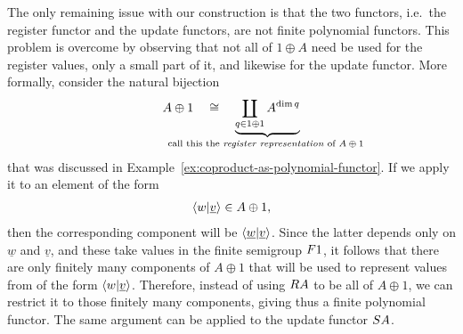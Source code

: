 The only remaining issue with our construction is that the two functors, i.e.~the register functor and the update functors, are not finite polynomial functors. This problem is overcome by observing that not all of $1 \oplus A$ need be used for the register values, only a small part of it, and likewise for the update functor. More formally, 
consider the natural bijection
\begin{align*}
A \oplus 1  \quad \cong \quad 
\myunderbrace{\coprod_{q \in 1 \oplus 1}  A^{\dim q}}{call this the \emph{register representation} of $A \oplus 1$}
\end{align*}
that was discussed in Example~\ref{ex:coproduct-as-polynomial-functor}. If we apply it to an element of the form
\begin{align*}
\langle w|\underline {v} \rangle \in A \oplus 1,
\end{align*}
then the corresponding component will be $\langle \underline w | \underline v \rangle$. Since the latter depends only  on $\underline w$ and $\underline v$, and these take values in the finite semigroup $\functor 1$, it follows that there are only finitely many components of $A \oplus 1$ that will be used to represent values from of the form $\langle w | \underline v \rangle$. Therefore, instead of using $\functorr A$ to be all of $A \oplus 1$, we can restrict it to those finitely many components, giving thus a finite polynomial functor. The same argument can be applied to the update functor $\functors A$.